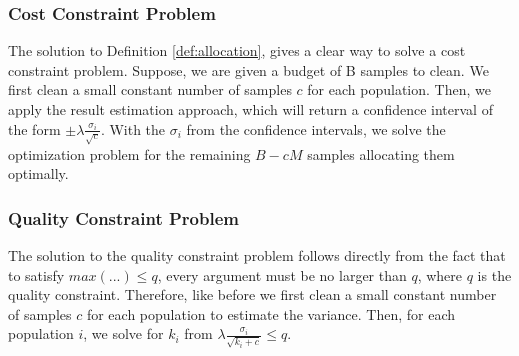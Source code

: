 
\subsubsection{Cost Constraint Problem}
The solution to Definition \ref{def:allocation}, gives a clear way to solve a cost constraint problem.
Suppose, we are given a budget of B samples to clean.
We first clean a small constant number of samples $c$ for each population.
Then, we apply the result estimation approach, which will return a confidence interval of the form $\pm\lambda\frac{\sigma_i}{\sqrt{c}}$.
With the $\sigma_i$ from the confidence intervals, we solve the optimization problem for the remaining $B-cM$ samples allocating them optimally.

\subsubsection{Quality Constraint Problem}
The solution to the quality constraint problem follows directly from the fact that to satisfy $max(...)\le q$, every argument must be no larger than $q$, where $q$ is the quality constraint.
Therefore, like before we first clean a small constant number of samples $c$ for each population to estimate the variance.
Then, for each population $i$, we solve for $k_i$ from $\lambda \frac{\sigma_i}{\sqrt{k_i+c}}\leq q$.